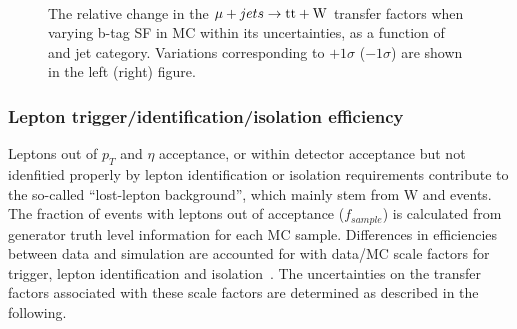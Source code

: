 \begin{figure}[]
  \centering
   ~~
  \\

  \caption{\label{fig:tfSyst_bsf_muToTtw} The relative change in the $\mj \rightarrow \mathrm{tt+W}$ transfer
  factors when varying b-tag SF in MC within its uncertainties, as a function of \scalht and jet category. 
  Variations corresponding to $+1\sigma$ ($-1\sigma$) are shown in the left (right) figure. 
  }
\end{figure}





\subsubsection*{Lepton trigger/identification/isolation efficiency}
\label{sec:tfSyst_lepton}

Leptons out of $p_{T}$ and $\eta$ acceptance, or within detector
acceptance but not idenfitied properly by lepton identification or isolation
requirements contribute to the so-called ``lost-lepton background'', 
which mainly stem from W and \ttbar events. 
The fraction of events with leptons out of acceptance ($f_{sample}$)
is calculated from generator truth level information for each MC
sample. Differences in efficiencies between data and simulation are
accounted for with data/MC scale
factors for trigger, lepton identification and isolation~\cite{twiki-leptonSF}. 
The uncertainties on the transfer factors associated 
with these scale factors are determined as described in the following.

